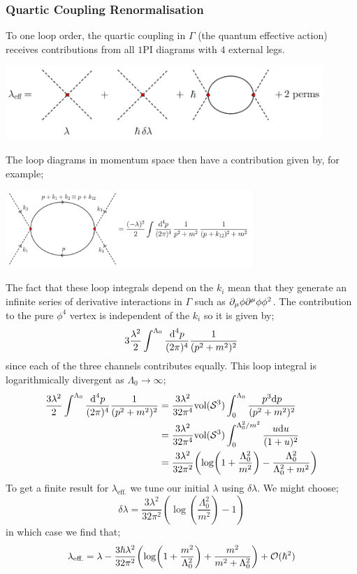 \subsubsection{Quartic Coupling Renormalisation}
To one loop order, the quartic coupling in $\Gamma$ (the quantum effective action) receives contributions from all $1$PI diagrams with $4$ external legs.
\begin{center}\includegraphics[width=0.9\textwidth]{graphics/aqft/quart1.png}\label{fig:quart1}\end{center}
The loop diagrams in momentum space then have a contribution given by, for example;
\begin{center}\includegraphics[width=0.7\textwidth]{graphics/aqft/quart2.png}\label{fig:quart2}\end{center}
The fact that these loop integrals depend on the $k_i$ mean that they generate an infinite series of derivative interactions in $\Gamma$ such as $\partial_\mu \phi \partial^{\mu} \phi \phi^2$. The contribution to the pure $\phi^4$ vertex is independent of the $k_i$ so it is given by;
\begin{equation*}
3 \frac{\lambda^2}{2} \int^{\Lambda_0}{\frac{\text{d}^4 p}{(2\pi)^4}\frac{1}{(p^2 + m^2)^2}}
\end{equation*}
since each of the three channels contributes equally. This loop integral is logarithmically divergent as $\Lambda_0 \rightarrow \infty$;
\begin{align*}
\frac{3\lambda^2}{2} \int^{\Lambda_0}{\frac{\ud^4 p}{(2\pi)^4}\frac{1}{(p^2 + m^2)^2}} &= \frac{3 \lambda^2}{32 \pi^4}\text{vol}(\mS^{3})\int_0^{\Lambda_0}{\frac{p^3 \ud p}{(p^2 + m^2)^2}} \\
&= \frac{3\lambda^2}{32\pi^4}\text{vol}(\mS^3)\int_0^{\Lambda_0^2 / m^2}{\frac{u \ud u}{(1 + u)^2}} \\
&= \frac{3\lambda^2}{32\pi^2}\left(\log\left(1 + \frac{\Lambda_0^2}{m^2}\right) - \frac{\Lambda_0^2}{\Lambda_0^2 + m^2}\right)
\end{align*}
To get a finite result for $\lambda_{\text{eff.}}$ we tune our initial $\lambda$ using $\delta \lambda$. We might choose;
\begin{equation}
\delta \lambda = \frac{3\lambda^2}{32\pi^2}\left(\log\left(\frac{\Lambda_0^2}{m^2}\right) - 1\right)
\end{equation}
in which case we find that;
\begin{equation}
\lambda_{\text{eff.}} = \lambda - \frac{3\hbar \lambda^2}{32 \pi^2}\left(\log\left(1 + \frac{m^2}{\Lambda_0^2}\right) + \frac{m^2}{m^2 + \Lambda_0^2}\right) + \mO(\hbar^2)
\end{equation}
